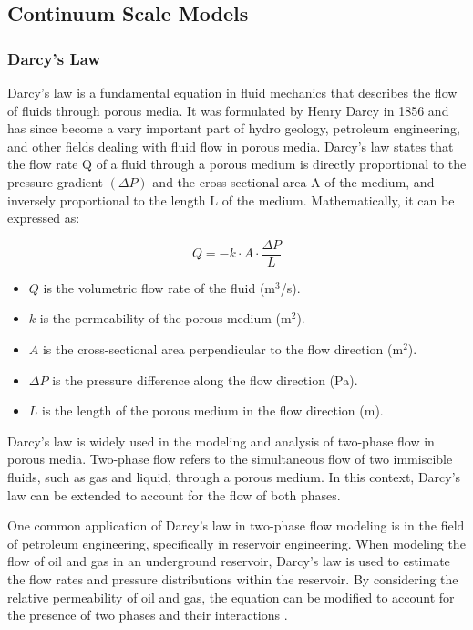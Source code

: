 {\subsection{Continuum Scale Models}
	\subsubsection{Darcy's Law}
		Darcy's law is a fundamental equation in fluid mechanics that describes the flow of fluids through porous media. It was formulated by Henry Darcy in 1856 and has since become a vary important part of hydro geology, petroleum engineering, and other fields dealing with fluid flow in porous media.
		Darcy's law states that the flow rate Q of a fluid through a porous medium is directly proportional to the pressure gradient $(\Delta P)$ and the cross-sectional area A of the medium, and inversely proportional to the length L of the medium. Mathematically, it can be expressed as:

		\[ Q = - k \cdot A \cdot \frac{\Delta P}{L} \]

		\begin{itemize}
			\item $Q$ is the volumetric flow rate of the fluid (m$^3$/s).
			
			\item $k$ is the permeability of the porous medium (m$^2$).
			
			\item $A$ is the cross-sectional area perpendicular to the flow direction (m$^2$).
			
			\item $\Delta P$ is the pressure difference along the flow direction (Pa).
			
			\item $L$ is the length of the porous medium in the flow direction (m).
			
		\end{itemize}
	
		Darcy's law is widely used in the modeling and analysis of two-phase flow in porous media. Two-phase flow refers to the simultaneous flow of two immiscible fluids, such as gas and liquid, through a porous medium. In this context, Darcy's law can be extended to account for the flow of both phases.
		
		One common application of Darcy's law in two-phase flow modeling is in the field of petroleum engineering, specifically in reservoir engineering. When modeling the flow of oil and gas in an underground reservoir, Darcy's law is used to estimate the flow rates and pressure distributions within the reservoir. By considering the relative permeability of oil and gas, the equation can be modified to account for the presence of two phases and their interactions \cite{uhlmann2005immersed}.
		
}
